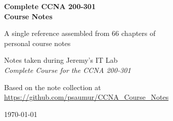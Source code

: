 \documentclass[11pt,a4paper]{report}
\begin{document}
\begin{titlepage}
  \centering
  \vspace*{3cm}
  {\Huge\bfseries Complete CCNA 200-301\\[0.4em] Course Notes\par}
  \vspace{1.5cm}
  {\large A single reference assembled from 66 chapters of\\[0.3em]
   personal course notes\par}
  \vfill
  {\large Notes taken during Jeremy's IT Lab\\[0.2em]
   \emph{Complete Course for the CCNA 200-301}\par}
  \vspace{1.2cm}
  {\small Based on the note collection at\\
   \url{https://github.com/psaumur/CCNA_Course_Notes}\par}
  \vspace{2cm}
  {\small\today\par}
\end{titlepage}

\tableofcontents
\end{document}
